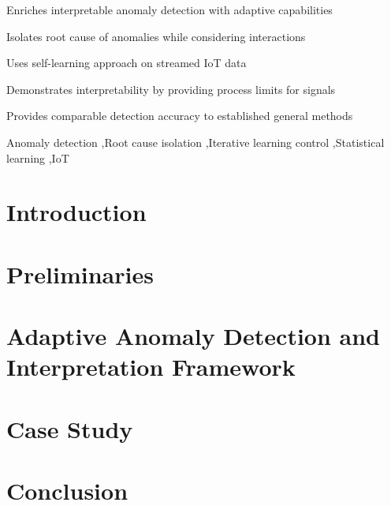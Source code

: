 \documentclass[preprint,12pt,authoryear]{elsarticle}
\begin{document}
\begin{frontmatter}
\begin{highlights}
\item Enriches interpretable anomaly detection with adaptive capabilities
\item Isolates root cause of anomalies while considering interactions
\item Uses self-learning approach on streamed IoT data
\item Demonstrates interpretability by providing process limits for signals
\item Provides comparable detection accuracy to established general methods
\end{highlights}

\begin{keyword}
Anomaly detection \sep Root cause isolation \sep Iterative learning control \sep Statistical learning \sep IoT
\end{keyword}

\end{frontmatter}

\linenumbers

\section{Introduction}
\label{Introduction}


\section{Preliminaries}
\label{Preliminaries}


\section{Adaptive Anomaly Detection and Interpretation Framework}
\label{Proposed Method}


\section{Case Study}
\label{Case Study}


\section{Conclusion}
\label{Conclusion}

\end{document}
